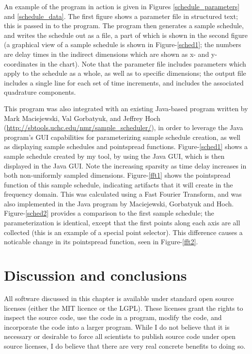 An example of the program in action is given in Figures \ref{schedule_parameters} 
and \ref{schedule_data}.  The first figure shows a parameter file in structured
text; this is passed in to the program.  The program then generates a sample
schedule, and writes the schedule out as a file, a part of which is shown in
the second figure (a graphical view of a sample schedule is shown in Figure-\ref{sched1};
the numbers are delay times in the indirect dimensions which are shown as x- 
and y-coordinates in the chart).  Note that the parameter file includes parameters which 
apply to the schedule as a whole, as well as to specific dimensions; the output
file includes a single line for each set of time increments, and includes the
associated quadrature components.

This program was also integrated with an existing Java-based program written
by Mark Maciejewski, Val Gorbatyuk, and Jeffrey Hoch 
(\url{http://sbtools.uchc.edu/nmr/sample_scheduler/}), in order to leverage
the Java program's GUI capabilities for parameterizing sample schedule creation,
as well as displaying sample schedules and pointspread functions.  
Figure-\ref{sched1} shows a sample schedule created by my tool, by using the
Java GUI, which is then displayed in the Java GUI.  Note the increasing
sparsity as time delay increases in both non-uniformly sampled dimensions.
Figure-\ref{fft1} shows the pointspread function of this sample schedule,
indicating artifacts that it will create in the frequency domain.  This was 
calculated using a Fast Fourier Transform, and was also implemented in the
Java program by Maciejewski, Gorbatyuk and Hoch.  Figure-\ref{sched2} provides
a comparison to the first sample schedule; the parameterization is identical,
except that the first points along each axis are all collected (this is an
example of a special point selector).  This difference causes a noticable 
change in its pointspread function, seen in Figure-\ref{fft2}.



\section{Discussion and conclusions}

All software discussed in this chapter is available under standard open source
licenses (either the MIT licence or the LGPL).  These licenses grant the rights
to inspect the source code, use the code in a program, modify the code, and
incorporate the code into a larger program.  While I do not believe that it is
necessary or desirable to force all scientists to publish source code under
open source licenses, I do believe that there are very real concrete benefits
to doing so.  


